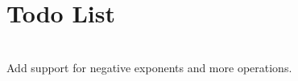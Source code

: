 \chapter{Todo List }
\label{todo}

\begin{DoxyRefList}
\item[{\parbox[t]{\linewidth}{Member \doxylink{class_calculation_engine_a19d4dd01a764735328b503a531be8ce0}{Calculation\+Engine::power} (double base, int exponent) const}}]\hfill \\
\label{todo__todo000001}%
%
Add support for negative exponents and more operations. 
\end{DoxyRefList}